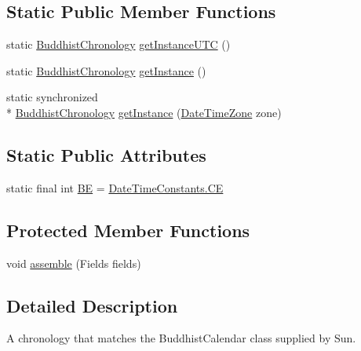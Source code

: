 \subsection*{Static Public Member Functions}
\begin{DoxyCompactItemize}
\item 
static \hyperlink{classorg_1_1joda_1_1time_1_1chrono_1_1_buddhist_chronology}{Buddhist\-Chronology} \hyperlink{classorg_1_1joda_1_1time_1_1chrono_1_1_buddhist_chronology_ad41cc4268be694e7340287aa6a744cd1}{get\-Instance\-U\-T\-C} ()
\item 
static \hyperlink{classorg_1_1joda_1_1time_1_1chrono_1_1_buddhist_chronology}{Buddhist\-Chronology} \hyperlink{classorg_1_1joda_1_1time_1_1chrono_1_1_buddhist_chronology_aae125287db5153410e649b362de3e6a7}{get\-Instance} ()
\item 
static synchronized \\*
\hyperlink{classorg_1_1joda_1_1time_1_1chrono_1_1_buddhist_chronology}{Buddhist\-Chronology} \hyperlink{classorg_1_1joda_1_1time_1_1chrono_1_1_buddhist_chronology_a200eba2389bd28d9b68974004c5da3f5}{get\-Instance} (\hyperlink{classorg_1_1joda_1_1time_1_1_date_time_zone}{Date\-Time\-Zone} zone)
\end{DoxyCompactItemize}
\subsection*{Static Public Attributes}
\begin{DoxyCompactItemize}
\item 
static final int \hyperlink{classorg_1_1joda_1_1time_1_1chrono_1_1_buddhist_chronology_a120b9b9edd23ae1728db1b85e3ede314}{B\-E} = \hyperlink{classorg_1_1joda_1_1time_1_1_date_time_constants_aacd9ad6e2964b143878d155f86db83bd}{Date\-Time\-Constants.\-C\-E}
\end{DoxyCompactItemize}
\subsection*{Protected Member Functions}
\begin{DoxyCompactItemize}
\item 
void \hyperlink{classorg_1_1joda_1_1time_1_1chrono_1_1_buddhist_chronology_a6c83d130816ba48488df9ca02cac7348}{assemble} (Fields fields)
\end{DoxyCompactItemize}


\subsection{Detailed Description}
A chronology that matches the Buddhist\-Calendar class supplied by Sun. 

